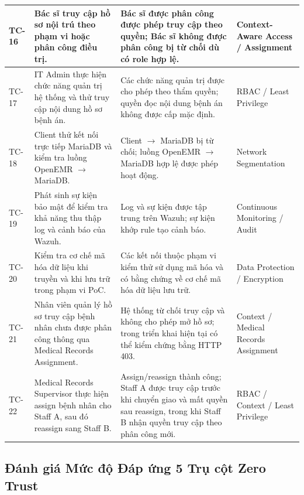 \begin{longtable}{|
>{\centering\arraybackslash}p{1.1cm} |
>{\raggedright\arraybackslash}p{4.8cm} |
>{\raggedright\arraybackslash}p{4.8cm} |
>{\raggedright\arraybackslash}p{3.5cm} |
}
TC-16 &
Bác sĩ truy cập hồ sơ nội trú theo phạm vi hoặc phân công điều trị. &
Bác sĩ được phân công được phép truy cập theo quyền; Bác sĩ không được phân công bị từ chối dù có role hợp lệ. &
Context-Aware Access / Assignment \\
\hline

TC-17 &
IT Admin thực hiện chức năng quản trị hệ thống và thử truy cập nội dung hồ sơ bệnh án. &
Các chức năng quản trị được cho phép theo thẩm quyền; quyền đọc nội dung bệnh án không được cấp mặc định. &
RBAC / Least Privilege \\
\hline

TC-18 &
Client thử kết nối trực tiếp MariaDB và kiểm tra luồng OpenEMR $\rightarrow$ MariaDB. &
Client $\rightarrow$ MariaDB bị từ chối; luồng OpenEMR $\rightarrow$ MariaDB hợp lệ được phép hoạt động. &
Network Segmentation \\
\hline

TC-19 &
Phát sinh sự kiện bảo mật để kiểm tra khả năng thu thập log và cảnh báo của Wazuh. &
Log và sự kiện được tập trung trên Wazuh; sự kiện khớp rule tạo cảnh báo. &
Continuous Monitoring / Audit \\
\hline

TC-20 &
Kiểm tra cơ chế mã hóa dữ liệu khi truyền và khi lưu trữ trong phạm vi PoC. &
Các kết nối thuộc phạm vi kiểm thử sử dụng mã hóa và có bằng chứng về cơ chế mã hóa dữ liệu lưu trữ. &
Data Protection / Encryption \\
\hline

TC-21 &
Nhân viên quản lý hồ sơ truy cập bệnh nhân chưa được phân công thông qua Medical Records Assignment. &
Hệ thống từ chối truy cập và không cho phép mở hồ sơ; trong triển khai hiện tại có thể kiểm chứng bằng HTTP 403. &
Context / Medical Records Assignment \\
\hline

TC-22 &
Medical Records Supervisor thực hiện assign bệnh nhân cho Staff A, sau đó reassign sang Staff B. &
Assign/reassign thành công; Staff A được truy cập trước khi chuyển giao và mất quyền sau reassign, trong khi Staff B nhận quyền truy cập theo phân công mới. &
RBAC / Context / Least Privilege \\
\hline

\end{longtable}
\endgroup

\subsection{Đánh giá Mức độ Đáp ứng 5 Trụ cột Zero Trust}

